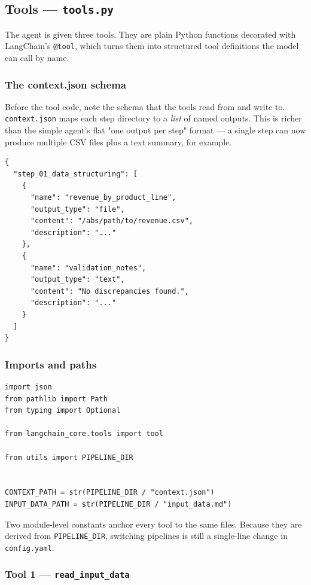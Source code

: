 \documentclass[12pt, a4paper]{article}
\begin{document}
\subsection{Tools — \texttt{tools.py}}

The agent is given three tools. They are plain Python functions decorated with LangChain's \texttt{@tool}, which turns them into structured tool definitions the model can call by name.

\subsubsection{The context.json schema}

Before the tool code, note the schema that the tools read from and write to. \texttt{context.json} maps each step directory to a \textit{list} of named outputs. This is richer than the simple agent's flat "one output per step" format — a single step can now produce multiple CSV files plus a text summary, for example.

\begin{lstlisting}[language={}]
{
  "step_01_data_structuring": [
    {
      "name": "revenue_by_product_line",
      "output_type": "file",
      "content": "/abs/path/to/revenue.csv",
      "description": "..."
    },
    {
      "name": "validation_notes",
      "output_type": "text",
      "content": "No discrepancies found.",
      "description": "..."
    }
  ]
}
\end{lstlisting}

\subsubsection{Imports and paths}

\begin{lstlisting}[style=pythonstyle]
import json
from pathlib import Path
from typing import Optional

from langchain_core.tools import tool

from utils import PIPELINE_DIR


CONTEXT_PATH = str(PIPELINE_DIR / "context.json")
INPUT_DATA_PATH = str(PIPELINE_DIR / "input_data.md")
\end{lstlisting}

Two module-level constants anchor every tool to the same files. Because they are derived from \texttt{PIPELINE\_DIR}, switching pipelines is still a single-line change in \texttt{config.yaml}.

\subsubsection{Tool 1 — \texttt{read\_input\_data}}
\end{document}
